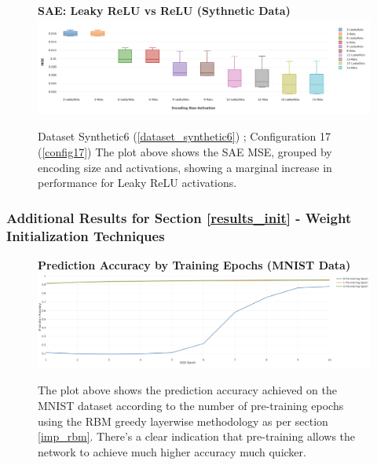 \documentclass[a4paper,11pt,oneside]{article}
\theoremstyle{plain}
\theoremstyle{definition}
\begin{document}
	\begin{figure}[H]
		\centering 
		\textbf{SAE: Leaky ReLU vs ReLU (Sythnetic Data)} 
		\includegraphics[scale=0.28]{images/results/activations/synthetic_mse_leakyrelu.png}
		\caption[SAE: Leaky ReLU vs ReLU (Sythnetic Data)]{Dataset Synthetic6  (\ref{dataset_synthetic6}) ; Configuration 17 (\ref{config17})
			\newline The plot above shows the SAE MSE, grouped by encoding size and activations, showing a marginal increase in performance for Leaky ReLU activations. }
		\label{figure-synthetic_mse_leakyrelu}
	\end{figure}
	
	\subsubsection{Additional Results for Section \ref{results_init} - Weight Initialization Techniques }\label{results_init_appendix}
	
	\begin{figure}[H]
		\centering 
		\textbf{Prediction Accuracy by Training Epochs (MNIST Data)} 
		\includegraphics[scale=0.2]{images/results/newinit/rbm_pretraining.png}
		\caption[Prediction Accuracy by Training Epochs (MNIST Data)]{The plot above shows the prediction accuracy achieved on the MNIST dataset according to the number of pre-training epochs using the RBM greedy layerwise methodology as per section \ref{imp_rbm}. There's a clear indication that pre-training allows the network to achieve much higher accuracy much quicker.}
		\label{figure-rbm_pretraining}
	\end{figure}
	
\end{document}
